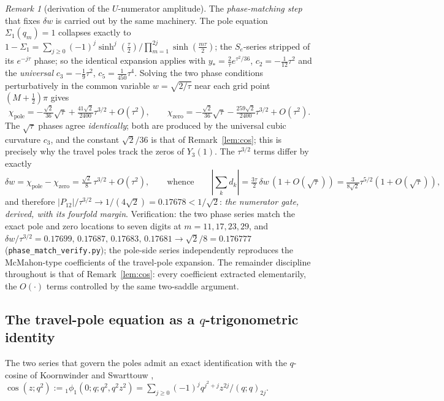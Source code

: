 \documentclass[11pt]{article}
\theoremstyle{plain}
\theoremstyle{definition}
\theoremstyle{remark}
\newtheorem{remark}[theorem]{Remark}
\begin{document}
\begin{remark}[derivation of the $U$-numerator amplitude]
The \emph{phase-matching step} that fixes $\delta w$ is carried out by the same machinery. The pole
equation $\Sigma_1(q_m)=1$ collapses exactly to
$1-\Sigma_1=\sum_{j\ge0}(-1)^j\sinh^j(\tfrac\tau2)/\prod_{m=1}^{2j}\sinh(\tfrac{m\tau}2)$; the
$S_e$-series stripped of its $e^{-j\tau}$ phase; so the identical expansion applies with
$y_*=\tfrac2\tau e^{\tau^2/36}$, $c_2=-\tfrac1{12}\tau^2$ and the \emph{universal} $c_3=-\tfrac19\tau^2$,
$c_5=\tfrac1{450}\tau^4$. Solving the two phase conditions perturbatively in the common variable
$w=\sqrt{2/\tau}$ near each grid point $(M+\tfrac12)\pi$ gives
\[
   \chi_{\mathrm{pole}}=-\tfrac{\sqrt2}{36}\sqrt\tau+\tfrac{41\sqrt2}{2400}\tau^{3/2}+O(\tau^2),
   \qquad
   \chi_{\mathrm{zero}}=-\tfrac{\sqrt2}{36}\sqrt\tau-\tfrac{259\sqrt2}{2400}\tau^{3/2}+O(\tau^2).
\]
The $\sqrt\tau$ phases agree \emph{identically}; both are produced by the universal cubic curvature
$c_3$, and the constant $\sqrt2/36$ is that of Remark~\ref{lem:cos}; this is precisely why the travel
poles track the zeros of $Y_3(1)$. The $\tau^{3/2}$ terms differ by exactly
\[
   \delta w=\chi_{\mathrm{pole}}-\chi_{\mathrm{zero}}=\tfrac{\sqrt2}8\,\tau^{3/2}+O(\tau^2),
   \qquad\text{whence}\qquad
   |\!\sum_kd_k|=\tfrac{3\tau}2\,\delta w\,(1+O(\sqrt\tau))=\tfrac3{8\sqrt2}\tau^{5/2}(1+O(\sqrt\tau)),
\]
and therefore $|P_{12}|/\tau^{3/2}\to1/(4\sqrt2)=0.17678<1/\sqrt2$: \emph{the numerator gate, derived,
with its fourfold margin}. Verification: the two phase series match the exact pole and zero locations to
seven digits at $m=11,17,23,29$, and $\delta w/\tau^{3/2}=0.17699,\,0.17687,\,0.17683,\,0.17681\to
\sqrt2/8=0.176777$ (\texttt{phase\_match\_verify.py}); the pole-side series independently reproduces the
McMahon-type coefficients of the travel-pole expansion. The remainder discipline throughout is that of
Remark~\ref{lem:cos}: every coefficient extracted elementarily, the $O(\cdot)$ terms controlled by the same
two-saddle argument.
\end{remark}

\subsection{The travel-pole equation as a $q$-trigonometric identity}\label{sec:qtrig}

The two series that govern the poles admit an exact identification with the $q$-cosine of
Koornwinder and Swarttouw \cite{KS1992}, $\cos(z;q^2):={}_1\phi_1(0;q;q^2,q^2z^2)
=\sum_{j\ge0}(-1)^j q^{j^2+j}z^{2j}/(q;q)_{2j}$.
\end{document}

